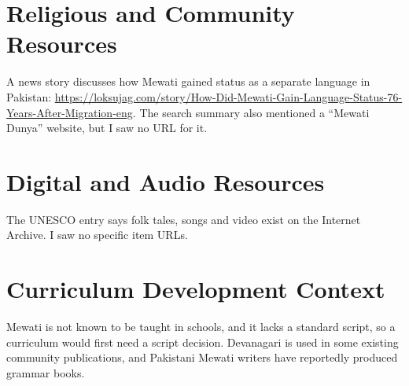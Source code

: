 \documentclass[12pt]{article}
\begin{document}
\section{Religious and Community Resources}
A news story discusses how Mewati gained status as a separate language in Pakistan: \url{https://loksujag.com/story/How-Did-Mewati-Gain-Language-Status-76-Years-After-Migration-eng}. The search summary also mentioned a ``Mewati Dunya'' website, but I saw no URL for it.

\section{Digital and Audio Resources}
The UNESCO entry says folk tales, songs and video exist on the Internet Archive. I saw no specific item URLs.

\section{Curriculum Development Context}
Mewati is not known to be taught in schools, and it lacks a standard script, so a curriculum would first need a script decision. Devanagari is used in some existing community publications, and Pakistani Mewati writers have reportedly produced grammar books.
\end{document}
